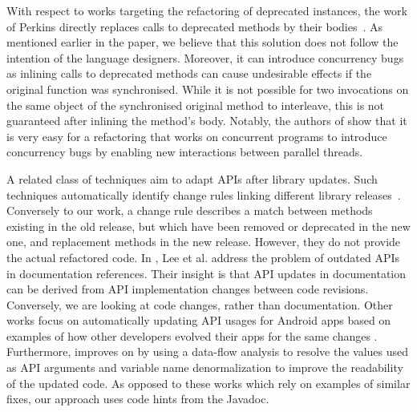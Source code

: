 \documentclass[sigconf,review,anonymous]{acmart}
\begin{document}
With respect to works targeting the refactoring of deprecated instances, the work of Perkins directly replaces calls to deprecated methods by their bodies~\cite{DBLP:conf/paste/Perkins05}.
As mentioned earlier in the paper, we believe that this solution does not follow the intention of the language designers. Moreover, it can
introduce concurrency bugs as inlining calls to deprecated
methods can cause undesirable effects if the original function was
synchronised.  While it is not possible for two invocations on the
same object of the synchronised original method to interleave, this is
not guaranteed after inlining the method's body. Notably, the authors of \cite{10.1007/978-3-642-14107-2_11}
show that it is very easy for a refactoring that works on concurrent
programs to introduce concurrency bugs by enabling new interactions between
parallel threads. %

A related class of techniques aim to adapt APIs after library updates. Such techniques
automatically identify change rules linking different library releases~\cite{DBLP:conf/icse/WuGAK10,DBLP:conf/kbse/Huang0PW021}. Conversely to our work, a change rule describes a match between methods existing in the old release, but which have been removed or deprecated in the new
one, and replacement methods in the new release. However, they do not provide the actual refactored code.
In \cite{DBLP:journals/tse/LeeWCK21}, Lee et al. address the problem of outdated APIs in documentation references. Their insight is that API updates in documentation can be derived from API implementation changes between code revisions. Conversely, we are looking at code changes, rather than documentation.
Other works focus on automatically updating API usages for Android apps based on
examples of how other developers evolved their apps for the same changes \cite{DBLP:conf/issta/FazziniXO19,DBLP:conf/iwpc/HaryonoTKSML0J20}. 
Furthermore, \cite{DBLP:journals/ese/HaryonoTLJLKSM22} improves on \cite{DBLP:conf/iwpc/HaryonoTKSML0J20} by using a data-flow analysis 
to resolve the values used as API arguments and variable name denormalization to improve the
readability of the updated code.
As opposed to these works which rely on examples of similar fixes, our approach uses code hints from the Javadoc.
\end{document}
